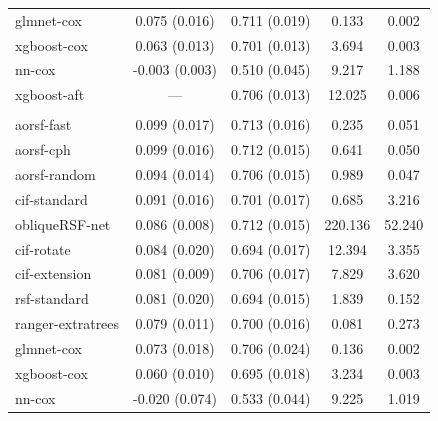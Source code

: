 \documentclass[12pt]{article}\usepackage[]{graphicx}\usepackage[]{xcolor}
\newenvironment{knitrout}{}{} %
\begin{document}
\begin{knitrout}
\begin{longtable}[t]{lcccc}
\hspace{1em}glmnet-cox & 0.075 (0.016) & 0.711 (0.019) & 0.133 & 0.002\\
\hspace{1em}xgboost-cox & 0.063 (0.013) & 0.701 (0.013) & 3.694 & 0.003\\
\hspace{1em}nn-cox & -0.003 (0.003) & 0.510 (0.045) & 9.217 & 1.188\\
\hspace{1em}xgboost-aft & --- & 0.706 (0.013) & 12.025 & 0.006\\
\addlinespace[0.3em]
\multicolumn{5}{l}{\textit{\textbf{Colon cancer; recurrence, n = 929, p = 12}}}\\
\hline
\hspace{1em}aorsf-fast & 0.099 (0.017) & 0.713 (0.016) & 0.235 & 0.051\\
\hspace{1em}aorsf-cph & 0.099 (0.016) & 0.712 (0.015) & 0.641 & 0.050\\
\hspace{1em}aorsf-random & 0.094 (0.014) & 0.706 (0.015) & 0.989 & 0.047\\
\hspace{1em}cif-standard & 0.091 (0.016) & 0.701 (0.017) & 0.685 & 3.216\\
\hspace{1em}obliqueRSF-net & 0.086 (0.008) & 0.712 (0.015) & 220.136 & 52.240\\
\hspace{1em}cif-rotate & 0.084 (0.020) & 0.694 (0.017) & 12.394 & 3.355\\
\hspace{1em}cif-extension & 0.081 (0.009) & 0.706 (0.017) & 7.829 & 3.620\\
\hspace{1em}rsf-standard & 0.081 (0.020) & 0.694 (0.015) & 1.839 & 0.152\\
\hspace{1em}ranger-extratrees & 0.079 (0.011) & 0.700 (0.016) & 0.081 & 0.273\\
\hspace{1em}glmnet-cox & 0.073 (0.018) & 0.706 (0.024) & 0.136 & 0.002\\
\hspace{1em}xgboost-cox & 0.060 (0.010) & 0.695 (0.018) & 3.234 & 0.003\\
\hspace{1em}nn-cox & -0.020 (0.074) & 0.533 (0.044) & 9.225 & 1.019\\

\end{longtable}
\end{knitrout}
\end{document}
